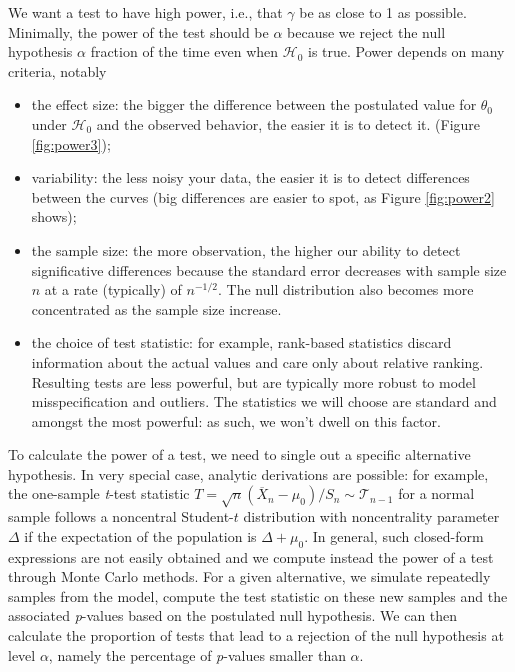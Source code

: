\documentclass[
  11pt,
  letterpaper,
]{book}
\providecommand{\tightlist}{%
  \setlength{\itemsep}{0pt}\setlength{\parskip}{0pt}}
\theoremstyle{definition}
\theoremstyle{definition}
\theoremstyle{definition}
\theoremstyle{remark}
\begin{document}
We want a test to have high power, i.e., that \(\gamma\) be as close to 1 as possible. Minimally, the power of the test should be \(\alpha\) because we reject the null hypothesis \(\alpha\) fraction of the time even when \(\mathscr{H}_0\) is true. Power depends on many criteria, notably

\begin{itemize}
\tightlist
\item
  the effect size: the bigger the difference between the postulated value for \(\theta_0\) under \(\mathscr{H}_0\) and the observed behavior, the easier it is to detect it.
  (Figure \ref{fig:power3});
\item
  variability: the less noisy your data, the easier it is to detect differences between the curves (big differences are easier to spot, as Figure \ref{fig:power2} shows);
\item
  the sample size: the more observation, the higher our ability to detect significative differences because the standard error decreases with sample size \(n\) at a rate (typically) of \(n^{-1/2}\). The null distribution also becomes more concentrated as the sample size increase.
\item
  the choice of test statistic: for example, rank-based statistics discard information about the actual values and care only about relative ranking. Resulting tests are less powerful, but are typically more robust to model misspecification and outliers. The statistics we will choose are standard and amongst the most powerful: as such, we won't dwell on this factor.
\end{itemize}

To calculate the power of a test, we need to single out a specific alternative hypothesis. In very special case, analytic derivations are possible: for example, the one-sample \emph{t}-test statistic \(T=\sqrt{n}(\overline{X}_n-\mu_0)/S_n \sim \mathcal{T}_{n-1}\) for a normal sample follows a noncentral Student-\(t\) distribution with noncentrality parameter \(\Delta\) if the expectation of the population is \(\Delta + \mu_0\). In general, such closed-form expressions are not easily obtained and we compute instead the power of a test through Monte Carlo methods. For a given alternative, we simulate repeatedly samples from the model, compute the test statistic on these new samples and the associated \emph{p}-values based on the postulated null hypothesis. We can then calculate the proportion of tests that lead to a rejection of the null hypothesis at level \(\alpha\), namely the percentage of \emph{p}-values smaller than \(\alpha\).
\end{document}
